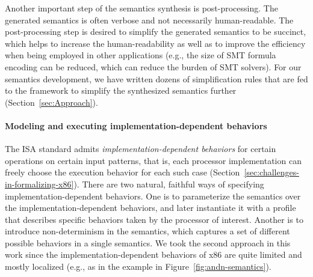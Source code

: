 %
%

Another important step of the semantics synthesis is post-processing. The generated semantics is often verbose and not necessarily human-readable. The post-processing step is desired to simplify the generated semantics to be succinct, which helps to increase the human-readability as well as to improve the efficiency when being employed in other applications (e.g., the size of SMT formula encoding can be reduced, which can reduce the burden of SMT solvers). For our semantics development, we have written dozens of simplification rules that are fed to the \K framework to simplify the synthesized semantics further (Section~\ref{sec:Approach}). 

\paragraph{Modeling and executing implementation-dependent behaviors}

The \ISA ISA standard admits \emph{implementation-dependent behaviors} for certain operations on certain input patterns, that is, each processor implementation can freely choose the execution behavior for each such case (Section~\ref{sec:challenges-in-formalizing-x86}).
There are two natural, faithful ways of specifying implementation-dependent behaviors.
One is to parameterize the semantics over the implementation-dependent behaviors, and later instantiate it with a profile that describes specific behaviors taken by the processor of interest.
Another is to introduce non-determinism in the semantics, which captures a set of different possible behaviors in a single semantics.
We took the second approach in this work since the implementation-dependent behaviors of x86 are quite limited and mostly localized (e.g., as in the example in Figure~\ref{fig:andn-semantics}).

